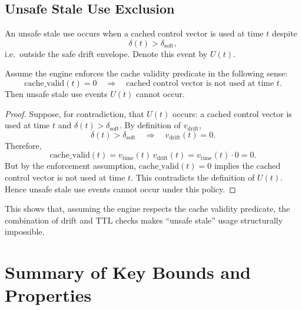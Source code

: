 \documentclass[11pt]{article}
\begin{document}
\subsection{Unsafe Stale Use Exclusion}

\begin{definition}
An unsafe stale use occurs when a cached control vector is used at time $t$ despite
\begin{equation}
  \delta(t) > \delta_{\mathrm{soft}},
\end{equation}
i.e.\ outside the safe drift envelope.
Denote this event by $U(t)$.
\end{definition}

\begin{proposition}
Assume the engine enforces the cache validity predicate in the following sense:
\begin{equation}
  \mathrm{cache\_valid}(t) = 0
  \quad\Rightarrow\quad
  \text{cached control vector is not used at time } t.
\end{equation}
Then unsafe stale use events $U(t)$ cannot occur.
\end{proposition}

\begin{proof}
Suppose, for contradiction, that $U(t)$ occurs: a cached control vector is used at time $t$ and $\delta(t) > \delta_{\mathrm{soft}}$.
By definition of $v_{\mathrm{drift}}$,
\begin{equation}
  \delta(t) > \delta_{\mathrm{soft}} \quad\Rightarrow\quad v_{\mathrm{drift}}(t) = 0.
\end{equation}
Therefore,
\begin{equation}
  \mathrm{cache\_valid}(t) = v_{\mathrm{time}}(t)\, v_{\mathrm{drift}}(t) = v_{\mathrm{time}}(t)\cdot 0 = 0.
\end{equation}
But by the enforcement assumption, $\mathrm{cache\_valid}(t) = 0$ implies the cached control vector is not used at time $t$.
This contradicts the definition of $U(t)$.
Hence unsafe stale use events cannot occur under this policy.
\end{proof}

This shows that, assuming the engine respects the cache validity predicate, the combination of drift and TTL checks makes ``unsafe stale'' usage structurally impossible.

\section{Summary of Key Bounds and Properties}
\end{document}
